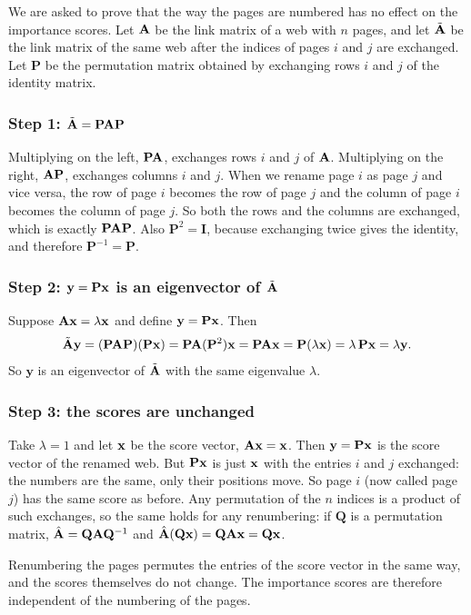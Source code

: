 

We are asked to prove that the way the pages are numbered has no effect on the importance scores.
Let $\mathbf{A}$ be the link matrix of a web with $n$ pages, and let $\tilde{\mathbf{A}}$ be the link matrix of the same web after the indices of pages $i$ and $j$ are exchanged.
Let $\mathbf{P}$ be the permutation matrix obtained by exchanging rows $i$ and $j$ of the identity matrix.


\subsubsection*{Step 1: $\tilde{\mathbf{A}} = \mathbf{P}\mathbf{A}\mathbf{P}$}

Multiplying on the left, $\mathbf{P}\mathbf{A}$, exchanges rows $i$ and $j$ of $\mathbf{A}$.
Multiplying on the right, $\mathbf{A}\mathbf{P}$, exchanges columns $i$ and $j$.
When we rename page $i$ as page $j$ and vice versa, the row of page $i$ becomes the row of page $j$ and the column of page $i$ becomes the column of page $j$.
So both the rows and the columns are exchanged, which is exactly $\mathbf{P}\mathbf{A}\mathbf{P}$.
Also $\mathbf{P}^2 = \mathbf{I}$, because exchanging twice gives the identity, and therefore $\mathbf{P}^{-1} = \mathbf{P}$.

\subsubsection*{Step 2: $\mathbf{y} = \mathbf{P}\mathbf{x}$ is an eigenvector of $\tilde{\mathbf{A}}$}

Suppose $\mathbf{A}\mathbf{x} = \lambda\mathbf{x}$ and define $\mathbf{y} = \mathbf{P}\mathbf{x}$. Then
\[
  \tilde{\mathbf{A}}\mathbf{y} = (\mathbf{P}\mathbf{A}\mathbf{P})(\mathbf{P}\mathbf{x}) = \mathbf{P}\mathbf{A}(\mathbf{P}^2)\mathbf{x} = \mathbf{P}\mathbf{A}\mathbf{x} = \mathbf{P}(\lambda\mathbf{x}) = \lambda\,\mathbf{P}\mathbf{x} = \lambda\mathbf{y}.
\]
So $\mathbf{y}$ is an eigenvector of $\tilde{\mathbf{A}}$ with the same eigenvalue $\lambda$.

\subsubsection*{Step 3: the scores are unchanged}

Take $\lambda = 1$ and let $\mathbf{x}$ be the score vector, $\mathbf{A}\mathbf{x} = \mathbf{x}$.
Then $\mathbf{y} = \mathbf{P}\mathbf{x}$ is the score vector of the renamed web.
But $\mathbf{P}\mathbf{x}$ is just $\mathbf{x}$ with the entries $i$ and $j$ exchanged: the numbers are the same, only their positions move.
So page $i$ (now called page $j$) has the same score as before.
Any permutation of the $n$ indices is a product of such exchanges, so the same holds for any renumbering: if $\mathbf{Q}$ is a permutation matrix, $\hat{\mathbf{A}} = \mathbf{Q}\mathbf{A}\mathbf{Q}^{-1}$ and $\hat{\mathbf{A}}(\mathbf{Q}\mathbf{x}) = \mathbf{Q}\mathbf{A}\mathbf{x} = \mathbf{Q}\mathbf{x}$.


Renumbering the pages permutes the entries of the score vector in the same way, and the scores themselves do not change.
The importance scores are therefore independent of the numbering of the pages.
